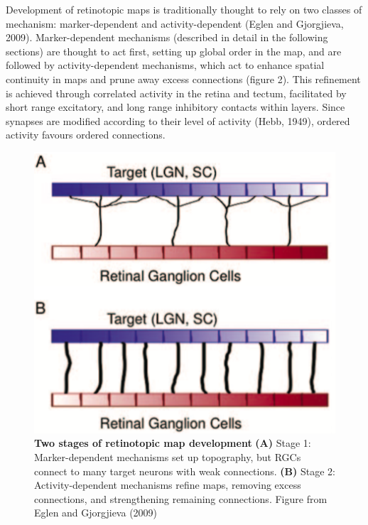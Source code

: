 \documentclass[11pt]{"article"}
\begin{document}
Development of retinotopic maps is traditionally thought to rely on two classes of mechanism: marker-dependent and activity-dependent (Eglen and Gjorgjieva, 2009). Marker-dependent mechanisms (described in detail in the following sections) are thought to act first, setting up global order in the map, and are followed by activity-dependent mechanisms, which act to enhance spatial continuity in maps and prune away excess connections (figure 2). This refinement is achieved through correlated activity in the retina and tectum, facilitated by short range excitatory, and long range inhibitory contacts within layers. Since synapses are modified according to their level of activity (Hebb, 1949), ordered activity favours ordered connections. 
\\

\pagebreak

\begin{figure}
\includegraphics[scale=0.21]{TwoMechanisms}
\caption{\textbf{Two stages of retinotopic map development}
\textbf{(A)} Stage 1: Marker-dependent mechanisms set up topography, but RGCs connect to many target neurons with weak connections.
\textbf{(B)} Stage 2: Activity-dependent mechanisms refine maps, removing excess connections, and strengthening remaining connections.
Figure from Eglen and Gjorgjieva (2009)}
\end{figure}
\end{document}
